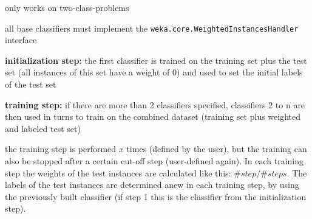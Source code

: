 \documentclass[a4paper]{book}
\begin{document}
\begin{tight_itemize}
	\item only works on two-class-problems
	\item all base classifiers must implement the 
	\texttt{weka.core.WeightedInstancesHandler} interface
	\item \textbf{initialization step:} the first classifier is trained on the 
	training set plus the test set (all instances of this set have a weight of 0) 
	and used to set the initial labels of the test set
	\item \textbf{training step:} if there are more than 2 classifiers specified, 
	classifiers 2 to n are then used in turns to train on the combined dataset 
	(training set plus weighted and labeled test set)
	\item the training step is performed $x$ times (defined by the user), but 
	the training can also be stopped after a certain cut-off step (user-defined 
	again). In each training step the weights of the test instances are 
	calculated like this: $\#step/\#steps$. The labels of the test instances 
	are determined anew in each training step, by using the previously built 
	classifier (if step 1 this is the classifier from the initialization step).
\end{tight_itemize}



\end{document}
